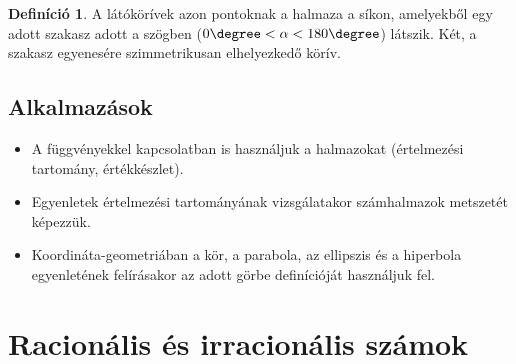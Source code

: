 \documentclass[twoside,12pt]{report}
\theoremstyle{definition}
\newtheorem{definition}[theorem]{Definíció}
\begin{document}
	\begin{definition}
		A látókörívek azon pontoknak a halmaza a síkon, amelyekből egy adott szakasz adott a szögben ($0\degree < \alpha < 180\degree$) látszik. Két, a szakasz egyenesére szimmetrikusan elhelyezkedő körív.
	\end{definition}
\section{Alkalmazások}
	\begin{itemize}
		\item A függvényekkel kapcsolatban is használjuk a halmazokat (értelmezési tartomány, értékkészlet).
		\item Egyenletek értelmezési tartományának vizsgálatakor számhalmazok metszetét képezzük.
		\item Koordináta-geometriában a kör, a parabola, az ellipszis és a hiperbola egyenletének felírásakor az adott görbe definícióját használjuk fel.
	\end{itemize}
\chapter{Racionális és irracionális számok}
\end{document}
